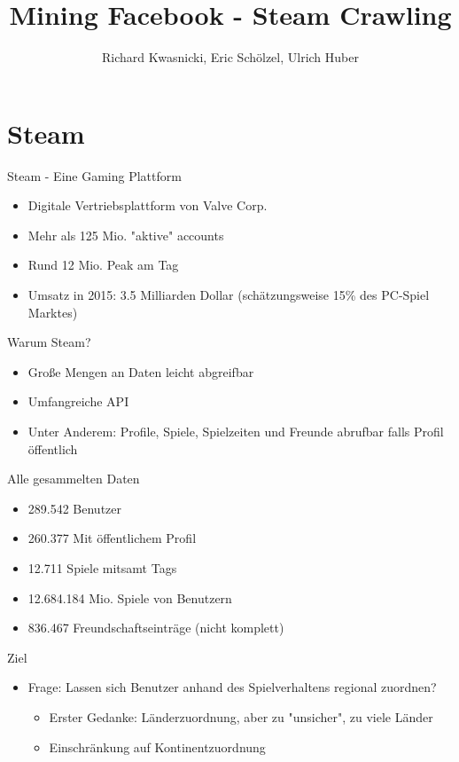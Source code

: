 \documentclass[12pt]{beamer}
\author{Richard Kwasnicki, Eric Schölzel, Ulrich Huber}
\title{Mining Facebook - Steam Crawling}
\begin{document}
\begin{frame}
\titlepage
\end{frame}


\section{Steam}
\begin{frame}{Steam - Eine Gaming Plattform}
	\begin{itemize}
	\item Digitale Vertriebsplattform von Valve Corp.
	\item Mehr als 125 Mio. "aktive" accounts
	\item Rund 12 Mio. Peak am Tag
	\item Umsatz in 2015:  3.5 Milliarden Dollar (schätzungsweise 15\% des PC-Spiel Marktes)
	\end{itemize}
\end{frame}

\begin{frame}{Warum Steam?}
	\begin{itemize}
	\item Große Mengen an Daten leicht abgreifbar
	\item Umfangreiche API
	\item Unter Anderem: Profile, Spiele, Spielzeiten und Freunde abrufbar falls Profil öffentlich 
	\end{itemize}
\end{frame}

\begin{frame}{Alle gesammelten Daten}
	\begin{itemize}
	\item 289.542 Benutzer
	\item 260.377 Mit öffentlichem Profil
	\item 12.711 Spiele mitsamt Tags
	\item 12.684.184 Mio. Spiele von Benutzern
	\item 836.467 Freundschaftseinträge (nicht komplett)
	\end{itemize}
\end{frame}

\begin{frame}{Ziel}
	\begin{itemize}
	\item Frage: Lassen sich Benutzer anhand des Spielverhaltens regional zuordnen?
		\begin{itemize}
		\item Erster Gedanke: Länderzuordnung, aber zu "unsicher", zu viele Länder
		\item Einschränkung auf Kontinentzuordnung
		\end{itemize}
	\end{itemize}
\end{frame}
\end{document}
